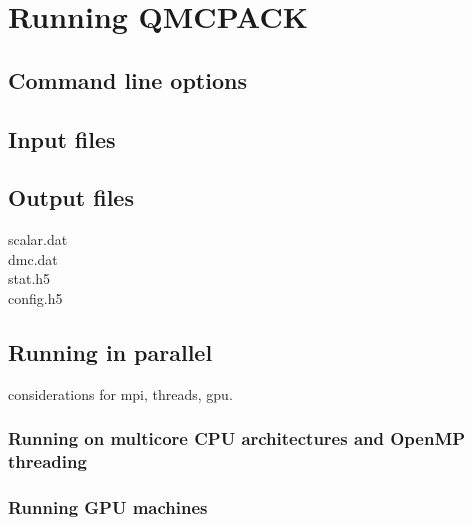 \chapter{Running QMCPACK}

\section{Command line options}

\section{Input files}

\section{Output files}
  scalar.dat\\
  dmc.dat\\
  stat.h5\\
  config.h5

\section{Running in parallel}
considerations for mpi, threads, gpu.

\subsection{Running on multicore CPU architectures and OpenMP threading}

\subsection{Running GPU machines}
